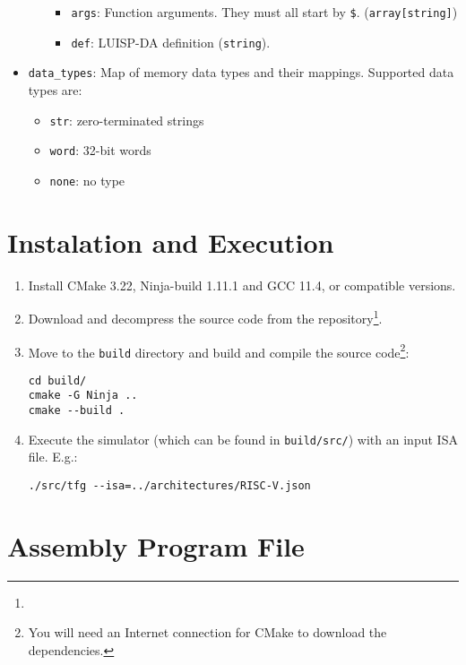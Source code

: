\begin{itemize}[nosep,noitemsep]
\begin{itemize}
\begin{itemize}[nosep,noitemsep]
        \item \texttt{args}: Function arguments. They must all start by \texttt{\$}. (\texttt{array[string]})
        \item \texttt{def}: LUISP-DA definition (\texttt{string}).
      \end{itemize}
    \end{itemize}
  \item \texttt{data\_types}: Map of memory data types and their mappings.  
      Supported data types are:
      \begin{itemize}[nosep,noitemsep]
        \item \texttt{str}: zero-terminated strings
        \item \texttt{word}: 32-bit words
        \item \texttt{none}: no type
      \end{itemize}
\end{itemize}



\section*{Instalation and Execution}

\begin{enumerate}
  \item Install CMake 3.22, Ninja-build 1.11.1 and GCC 11.4, or compatible versions.
  \item Download and decompress the source code from the repository\footnote{\myrepo}.
  \item Move to the \texttt{build} directory and build and compile the source code\footnote{You will need an Internet connection for CMake to download the dependencies.}:
  \begin{tcolorbox}[bottom=-8pt]
    \begin{verbatim}
cd build/
cmake -G Ninja ..
cmake --build .
    \end{verbatim}
  \end{tcolorbox}
  \item Execute the simulator (which can be found in \texttt{build/src/}) with an input \gls{ISA} file. E.g.:
  \begin{tcolorbox}[bottom=-8pt]
    \begin{verbatim}
./src/tfg --isa=../architectures/RISC-V.json
    \end{verbatim}
  \end{tcolorbox}
\end{enumerate}


\section*{Assembly Program File}